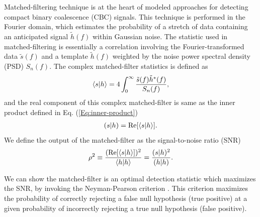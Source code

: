 Matched-filtering technique is at the heart of modeled approaches for detecting compact binary coalescence (CBC) signals. This technique is performed in the Fourier domain, which estimates the probability of a stretch of data containing an anticipated signal $\tilde{h}(f)$ within Gaussian noise. The statistic used in matched-filtering is essentially a correlation involving the Fourier-transformed data $\tilde{s}(f)$ and a template $\tilde{h}(f)$ weighted by the noise power spectral density (PSD) $S_n(f)$. The complex matched-filter statistics is defined as 
\begin{align}
    \label{Eq:complex_matched_filter}
    \braket{s|h} = 4\int_{0}^{\infty} \dfrac{\tilde{s}(f)\tilde{h}^*(f)}{S_n(f)},
\end{align}
and the real component of this complex matched-filter is same as the inner product defined in Eq. (\ref{Eq:inner-product})
\begin{align}
    (s|h) = \Re [\innerproduct{s}{h}].
\end{align}
We define the output of the matched-filter as the signal-to-noise ratio (SNR)
\begin{align}
    \label{Eq:SNR_def}
    \rho^2 \equiv \dfrac{(\operatorname{Re}[\braket{s|h}])^2}{\braket{h|h}} = \dfrac{(s|h)^2}{(h|h)}.
\end{align}

We can show the matched-filter is an optimal detection statistic which maximizes the SNR, by invoking the Neyman-Pearson criterion \cite{Wainstein1963}. This criterion maximizes the probability of correctly rejecting a false null hypothesis (true positive) at a given probability of incorrectly rejecting a true null hypothesis (false positive). 

